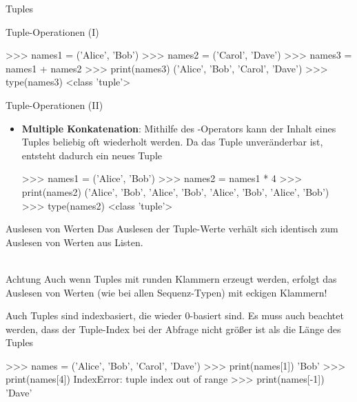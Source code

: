 \begin{subsection}{Tuples}
\begin{frame}[fragile]{Tuple-Operationen (I)}
\begin{itemize}
\begin{pyconcode}
>>> names1 = ('Alice', 'Bob')
>>> names2 = ('Carol', 'Dave')
>>> names3 = names1 + names2
>>> print(names3)
('Alice', 'Bob', 'Carol', 'Dave')
>>> type(names3)
<class 'tuple'>
\end{pyconcode}                 
               
           \end{itemize}
        \end{frame}
        
        
        \begin{frame}[fragile]{Tuple-Operationen (II)}

           \begin{itemize}
               \item \textbf{Multiple Konkatenation}: Mithilfe des \code{*}-Operators kann der Inhalt eines Tuples beliebig oft wiederholt werden. Da das Tuple unveränderbar ist, entsteht dadurch ein neues Tuple

\begin{pyconcode}
>>> names1 = ('Alice', 'Bob')
>>> names2 = names1 * 4
>>> print(names2)
('Alice', 'Bob', 'Alice', 'Bob', 'Alice', 'Bob', 'Alice', 'Bob')
>>> type(names2)
<class 'tuple'>
\end{pyconcode}                 
               
           \end{itemize}
        \end{frame}
        
        
        \begin{frame}[fragile]{Auslesen von Werten}
            Das Auslesen der Tuple-Werte verhält sich identisch zum Auslesen von Werten aus Listen. \\~\
            
            \begin{alertblock}{Achtung}
                Auch wenn Tuples mit runden Klammern erzeugt werden, erfolgt das Auslesen von Werten (wie bei allen Sequenz-Typen) mit eckigen Klammern!
            \end{alertblock}
            
            Auch Tuples sind indexbasiert, die wieder 0-basiert sind. Es muss auch beachtet werden, dass der Tuple-Index bei der Abfrage nicht größer ist als die Länge des Tuples
            
\begin{pyconcode}
>>> names = ('Alice', 'Bob', 'Carol', 'Dave')
>>> print(names[1])
'Bob'
>>> print(names[4])
IndexError: tuple index out of range
>>> print(names[-1])
'Dave'
\end{pyconcode}                 
               

\end{frame}
\end{subsection}
